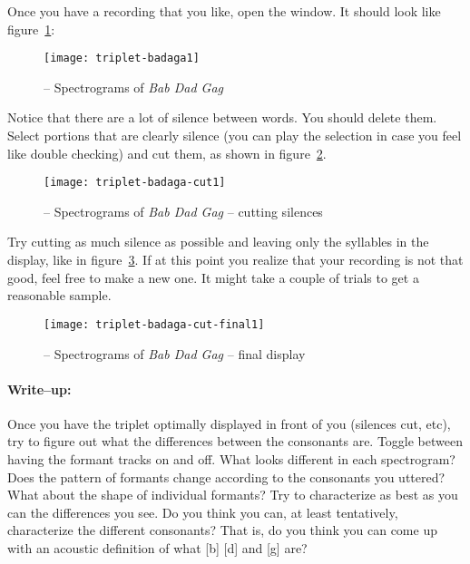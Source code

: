 Once you have a recording that you like, open the  window. It should look like figure~\ref{step1triplet}:

\begin{figure}[!tbp]
\caption{\Praat{} -- Spectrograms of \emph{Bab Dad Gag}}
\label{step1triplet}
	\begin{center}
		\texttt{[image: triplet-badaga1]}
	\end{center}
\end{figure}

Notice that there are a lot of silence between words. You should delete them. Select portions that are clearly silence (you can play the selection in case you feel like double checking) and cut them, as shown in figure~\ref{step2triplet}.

\begin{figure}[!tbp]
\caption{\Praat{} -- Spectrograms of \emph{Bab Dad Gag} -- cutting silences}
\label{step2triplet}
	\begin{center}
		\texttt{[image: triplet-badaga-cut1]}
	\end{center}
\end{figure}

Try cutting as much silence as possible and leaving only the syllables in the display, like in figure~\ref{step3triplet}. If at this point you realize that your recording is not that good, feel free to make a new one. It might take a couple of trials to get a reasonable sample.

\begin{figure}[!tbp]
\caption{\Praat{} -- Spectrograms of \emph{Bab Dad Gag} -- final display}
\label{step3triplet}
	\begin{center}
		\texttt{[image: triplet-badaga-cut-final1]}
	\end{center}
\end{figure}

\paragraph{Write--up:} Once you have the triplet optimally displayed in front of you (silences cut, etc), try to figure out what the differences between the consonants are. Toggle between having the formant tracks on and off. What looks different in each spectrogram? Does the pattern of formants change according to the consonants you uttered? What about the shape of individual formants? Try to characterize as best as you can the differences you see. Do you think you can, at least tentatively, characterize the different consonants? That is, do you think you can come up with an acoustic definition of what [b] [d] and [g] are?

